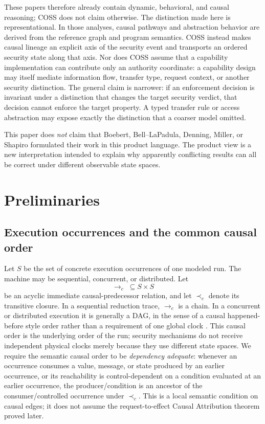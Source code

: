 \documentclass[10pt,twocolumn]{article}
\newcommand{\Model}{\textnormal{\textsc{COSS}}\xspace}
\newcommand{\hb}{\prec_{c}}
\begin{document}
These papers therefore already contain dynamic, behavioral, and causal
reasoning; \Model does not claim otherwise.  The distinction made here is
representational.  In those analyses, causal pathways and abstraction behavior
are derived from the reference graph and program semantics.  \Model instead
makes causal lineage an explicit axis of the security event and transports an
ordered security state along that axis.  Nor does \Model assume that a
capability implementation can contribute only an authority coordinate: a
capability design may itself mediate information flow, transfer type, request
context, or another security distinction.  The general claim is narrower: if an
enforcement decision is invariant under a distinction that changes the target
security verdict, that decision cannot enforce the target property.  A typed
transfer rule or access abstraction may expose exactly the distinction that a
coarser model omitted.

This paper does \emph{not} claim that Boebert, Bell--LaPadula, Denning, Miller,
or Shapiro formulated their work in this product language.  The product view is
a new interpretation intended to explain why apparently conflicting results
can all be correct under different observable state spaces.

\section{Preliminaries}

\subsection{Execution occurrences and the common causal order}

Let $S$ be the set of concrete execution occurrences of one modeled run. The
machine may be sequential, concurrent, or distributed. Let
\begin{equation}
  \to_c\;\subseteq S\times S
\end{equation}
be an acyclic immediate causal-predecessor relation, and let $\hb$ denote its
transitive closure. In a sequential reduction trace, $\to_c$ is a chain. In a
concurrent or distributed execution it is generally a DAG, in the sense of a
causal happened-before style order rather than a requirement of one global
clock \cite{lamport1978}. This causal order is the underlying order of the run;
security mechanisms do not receive independent physical clocks merely because
they use different state spaces. We require the semantic causal order to be
\emph{dependency adequate}: whenever an occurrence consumes a value, message,
or state produced by an earlier occurrence, or its reachability is
control-dependent on a condition evaluated at an earlier occurrence, the
producer/condition is an ancestor of the consumer/controlled occurrence under
$\hb$. This is a local semantic condition on causal edges; it does not assume
the request-to-effect Causal Attribution theorem proved later.
\end{document}

